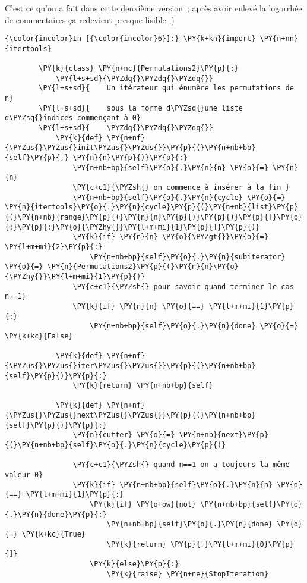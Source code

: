     C'est ce qu'on a fait dans cette deuxième version~; après avoir enlevé
la logorrhée de commentaires ça redevient presque lisible ;)

    \begin{Verbatim}[commandchars=\\\{\}]
{\color{incolor}In [{\color{incolor}6}]:} \PY{k+kn}{import} \PY{n+nn}{itertools}
        
        \PY{k}{class} \PY{n+nc}{Permutations2}\PY{p}{:}
            \PY{l+s+sd}{\PYZdq{}\PYZdq{}\PYZdq{}}
        \PY{l+s+sd}{    Un itérateur qui énumère les permutations de n}
        \PY{l+s+sd}{    sous la forme d\PYZsq{}une liste d\PYZsq{}indices commençant à 0}
        \PY{l+s+sd}{    \PYZdq{}\PYZdq{}\PYZdq{}}
            \PY{k}{def} \PY{n+nf}{\PYZus{}\PYZus{}init\PYZus{}\PYZus{}}\PY{p}{(}\PY{n+nb+bp}{self}\PY{p}{,} \PY{n}{n}\PY{p}{)}\PY{p}{:}
                \PY{n+nb+bp}{self}\PY{o}{.}\PY{n}{n} \PY{o}{=} \PY{n}{n}
                \PY{c+c1}{\PYZsh{} on commence à insérer à la fin }
                \PY{n+nb+bp}{self}\PY{o}{.}\PY{n}{cycle} \PY{o}{=} \PY{n}{itertools}\PY{o}{.}\PY{n}{cycle}\PY{p}{(}\PY{n+nb}{list}\PY{p}{(}\PY{n+nb}{range}\PY{p}{(}\PY{n}{n}\PY{p}{)}\PY{p}{)}\PY{p}{[}\PY{p}{:}\PY{p}{:}\PY{o}{\PYZhy{}}\PY{l+m+mi}{1}\PY{p}{]}\PY{p}{)}
                \PY{k}{if} \PY{n}{n} \PY{o}{\PYZgt{}}\PY{o}{=} \PY{l+m+mi}{2}\PY{p}{:}
                    \PY{n+nb+bp}{self}\PY{o}{.}\PY{n}{subiterator} \PY{o}{=} \PY{n}{Permutations2}\PY{p}{(}\PY{n}{n}\PY{o}{\PYZhy{}}\PY{l+m+mi}{1}\PY{p}{)}
                \PY{c+c1}{\PYZsh{} pour savoir quand terminer le cas n==1}
                \PY{k}{if} \PY{n}{n} \PY{o}{==} \PY{l+m+mi}{1}\PY{p}{:}
                    \PY{n+nb+bp}{self}\PY{o}{.}\PY{n}{done} \PY{o}{=} \PY{k+kc}{False}
        
            \PY{k}{def} \PY{n+nf}{\PYZus{}\PYZus{}iter\PYZus{}\PYZus{}}\PY{p}{(}\PY{n+nb+bp}{self}\PY{p}{)}\PY{p}{:}
                \PY{k}{return} \PY{n+nb+bp}{self}
        
            \PY{k}{def} \PY{n+nf}{\PYZus{}\PYZus{}next\PYZus{}\PYZus{}}\PY{p}{(}\PY{n+nb+bp}{self}\PY{p}{)}\PY{p}{:}
                \PY{n}{cutter} \PY{o}{=} \PY{n+nb}{next}\PY{p}{(}\PY{n+nb+bp}{self}\PY{o}{.}\PY{n}{cycle}\PY{p}{)}
        
                \PY{c+c1}{\PYZsh{} quand n==1 on a toujours la même valeur 0}
                \PY{k}{if} \PY{n+nb+bp}{self}\PY{o}{.}\PY{n}{n} \PY{o}{==} \PY{l+m+mi}{1}\PY{p}{:}
                    \PY{k}{if} \PY{o+ow}{not} \PY{n+nb+bp}{self}\PY{o}{.}\PY{n}{done}\PY{p}{:}
                        \PY{n+nb+bp}{self}\PY{o}{.}\PY{n}{done} \PY{o}{=} \PY{k+kc}{True}
                        \PY{k}{return} \PY{p}{[}\PY{l+m+mi}{0}\PY{p}{]}
                    \PY{k}{else}\PY{p}{:}
                        \PY{k}{raise} \PY{n+ne}{StopIteration}
        

\end{Verbatim}
